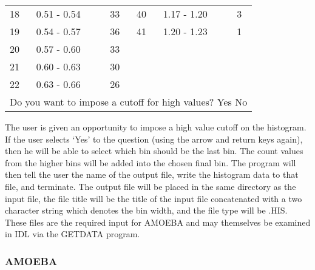 \begin{center}
\begin{tabular}{||l l l|l l l||}
             18 &  0.51 - 0.54  &   33 &  40 &  1.17 - 1.20  &    3 \\
             19 &  0.54 - 0.57  &   36 &  41 &  1.20 - 1.23  &    1 \\
             20 &  0.57 - 0.60  &   33 &     &               &      \\
             21 &  0.60 - 0.63  &   30 &     &               &      \\
             22 &  0.63 - 0.66  &   26 &     &               &      \\
\hline
\multicolumn{6}{||l||}{Do you want to impose a cutoff for high values?   Yes  
No} \\ \hline
\end{tabular}
\end{center}

      The user is given an opportunity to impose a high value cutoff on
   the histogram.  If the user selects `Yes' to the question (using the
   arrow and return keys again), then he will be able to select which bin
   should be the last bin.  The count values from the higher bins will be
   added into the chosen final bin.
      The program will then tell the user the name of the output file,
   write the histogram data to that file, and terminate.  The output file
   will be placed in the same directory as the input file, the file title
   will be the title of the input file concatenated with a two character
   string which denotes the bin width, and the file type will be 
   .HIS. These files are the required input for AMOEBA and may themselves be
   examined in IDL via the GETDATA program.

\subsubsection{AMOEBA}

